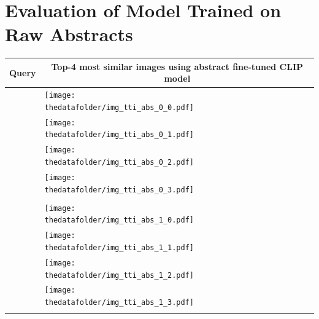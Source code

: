 \documentclass[10pt]{article} %
\begin{document}
\section{Evaluation of Model Trained on Raw Abstracts}

\begin{table}[h!]
  \centering
  \begin{tabular}{m{3cm} p{3cm} p{3cm} p{3cm} p{3cm}}
      \toprule
      \centering \bfseries Query & \multicolumn{4}{c}{\bfseries{Top-4 most similar images using \textcolor{deepblue}{abstract fine-tuned CLIP model}}} \tabularnewline
      \midrule
       \texttt{} \vspace{20mm} & \centering \texttt{[image: \\thedatafolder/img\_tti\_abs\_0\_0.pdf]} \\  & \centering \texttt{[image: \\thedatafolder/img\_tti\_abs\_0\_1.pdf]} \\  & \centering \texttt{[image: \\thedatafolder/img\_tti\_abs\_0\_2.pdf]} \\  & \centering \texttt{[image: \\thedatafolder/img\_tti\_abs\_0\_3.pdf]} \\   \tabularnewline
      \midrule
      \texttt{} \vspace{20mm} & \centering \texttt{[image: \\thedatafolder/img\_tti\_abs\_1\_0.pdf]} \\  & \centering \texttt{[image: \\thedatafolder/img\_tti\_abs\_1\_1.pdf]} \\  & \centering \texttt{[image: \\thedatafolder/img\_tti\_abs\_1\_2.pdf]} \\  & \centering \texttt{[image: \\thedatafolder/img\_tti\_abs\_1\_3.pdf]} \\   \tabularnewline
      \midrule

\end{tabular}
\end{table}
\end{document}
